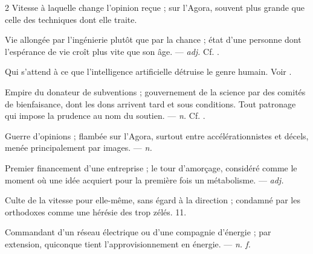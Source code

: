 \begin{multicols}{2}
 Vitesse à laquelle change l'opinion reçue ; sur l'Agora, souvent plus grande que celle des techniques dont elle traite. 

 Vie allongée par l'ingénierie plutôt que par la chance ; état d'une personne dont l'espérance de vie croît plus vite que son âge.  —  \textit{adj.} Cf. .

  Qui s'attend à ce que l'intelligence artificielle détruise le genre humain. Voir .

  Empire du donateur de subventions ; gouvernement de la science par des comités de bienfaisance, dont les dons arrivent tard et sous conditions.   Tout patronage qui impose la prudence au nom du soutien. —  \textit{n.} Cf. .

 Guerre d'opinions ; flambée sur l'Agora, surtout entre accélérationnistes et décels, menée principalement par images. —  \textit{n.}

 Premier financement d'une entreprise ; le tour d'amorçage, considéré comme le moment où une idée acquiert pour la première fois un métabolisme.   —  \textit{adj.}

 Culte de la vitesse pour elle-même, sans égard à la direction ; condamné par les orthodoxes comme une hérésie des trop zélés.   11.

 Commandant d'un réseau électrique ou d'une compagnie d'énergie ; par extension, quiconque tient l'approvisionnement en énergie. —  \textit{n. f.}


\end{multicols}
